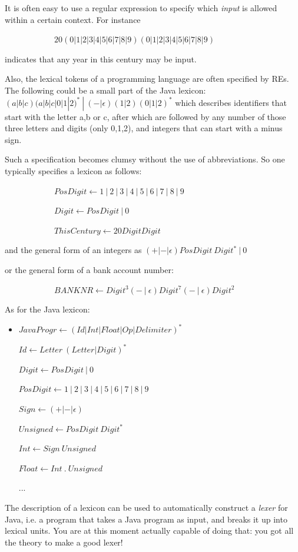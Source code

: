 It is often easy to use a regular expression to specify which {\em
  input} is allowed within a certain context. For instance


~~~~~~~~~~~~$20(0|1|2|3|4|5|6|7|8|9)(0|1|2|3|4|5|6|7|8|9)$

indicates that any year in this century may be input.

Also, the lexical tokens of a programming language are often specified
by REs. The following could be a small part of the Java lexicon:
$(a|b|c)(a|b|c|0|1|2)^*~|~(-|\epsilon)(1|2)(0|1|2)^*$ which describes
identifiers that start with the letter a,b or c, after which are
followed by any number of those three letters and digits (only 0,1,2),
and integers that can start with a minus sign.

Such a specification becomes clumsy without the use of
abbreviations. So one typically specifies a lexicon as follows:


~~~~~~~~~~~~$PosDigit \leftarrow 1~|~2~|~3~|~4~|~5~|~6~|~7~|~8~|~9$

~~~~~~~~~~~~$Digit \leftarrow PosDigit~|~0$


~~~~~~~~~~~~$ThisCentury \leftarrow 20DigitDigit$

and the general form of an integers as $(+|-|\epsilon)PosDigit~Digit^*~|~0$

or the general form of a bank account number:


~~~~~~~~~~~~$BANKNR \leftarrow Digit^3(-~|~\epsilon)Digit^7(-~|~\epsilon)Digit^2$

As for the Java lexicon:


\begin{itemize}
\item[]
$JavaProgr \leftarrow (Id|Int|Float|Op|Delimiter)^*$

$Id \leftarrow Letter~(Letter|Digit)^*$

$Digit \leftarrow PosDigit~|~0$

$PosDigit \leftarrow 1~|~2~|~3~|~4~|~5~|~6~|~7~|~8~|~9$

$Sign \leftarrow (+|-|\epsilon)$

$Unsigned \leftarrow PosDigit~Digit^*$

$Int \leftarrow Sign~Unsigned$

$Float \leftarrow Int~.~Unsigned$

...
\end{itemize}

\label{flexlabel}
The description of a lexicon can be used to automatically construct a
{\em lexer} for Java, i.e. a program that takes a Java program as input,
and breaks it up into lexical units. You are at this moment actually
capable of doing that: you got all the theory to make a good lexer!

